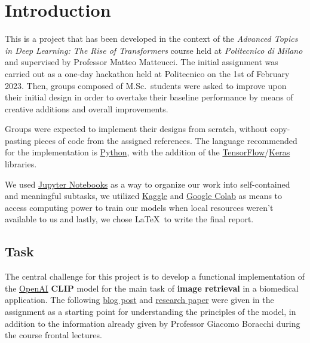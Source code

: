 \documentclass[12pt, a4paper]{article}
\title{}
\date{}
\author{\textit{Raul Singh} \and \textit{Davide Rigamonti}}
\begin{document}

\newpage

{
    \hypersetup{hidelinks}
    \tableofcontents
}

\newpage
{}


\section{Introduction}
This is a project that has been developed in the context of the \textit{Advanced Topics in Deep Learning: The Rise of Transformers} course held at \textit{Politecnico di Milano} and supervised by Professor Matteo Matteucci.
The initial assignment was carried out as a one-day hackathon held at Politecnico on the 1st of February 2023.
Then, groups composed of M.Sc.\ students were asked to improve upon their initial design in order to overtake their baseline performance by means of creative additions and overall improvements.

Groups were expected to implement their designs from scratch, without copy-pasting pieces of code from the assigned references.
The language recommended for the implementation is \href{https://www.python.org/}{Python}, with the addition of the \href{https://www.tensorflow.org/}{TensorFlow}/\href{https://keras.io/}{Keras} libraries.

We used \href{https://jupyter.org/}{Jupyter Notebooks} as a way to organize our work into self-contained and meaningful subtasks, we utilized \href{https://www.kaggle.com/}{Kaggle} and \href{https://colab.research.google.com}{Google Colab} as means to access computing power to train our models when local resources weren't available to us and lastly, we chose \LaTeX~to write the final report.

\subsection{Task}
The central challenge for this project is to develop a functional implementation of the \href{https://openai.com/}{OpenAI} \textbf{CLIP} model for the main task of \textbf{image retrieval} in a biomedical application.
The following \href{https://openai.com/research/clip}{blog post} and \href{https://arxiv.org/pdf/2103.00020.pdf}{research paper} were given in the assignment as a starting point for understanding the principles of the model, in addition to the information already given by Professor Giacomo Boracchi during the course frontal lectures.
\end{document}
